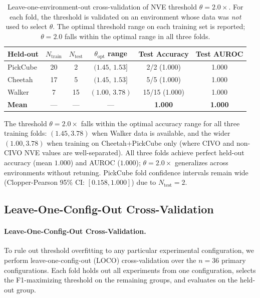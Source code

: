 \begin{table}[h]
\centering
\caption{Leave-one-environment-out cross-validation of NVE threshold $\theta=2.0\times$.
For each fold, the threshold is validated on an environment whose data was \emph{not} used
to select $\theta$. The optimal threshold range on each training set is reported;
$\theta=2.0$ falls within the optimal range in all three folds.}
\label{tab:nve_loeo}
\begin{tabular}{lccccc}
\toprule
Held-out & $N_{\text{train}}$ & $N_{\text{test}}$ & $\theta_{\text{opt}}$ range & Test Accuracy & Test AUROC \\
\midrule
PickCube & 20 & 2 & $(1.45,\, 1.53]$ & 2/2 (1.000) & 1.000 \\
Cheetah  & 17 & 5 & $(1.45,\, 1.53]$ & 5/5 (1.000) & 1.000 \\
Walker   &  7 & 15 & $(1.00,\, 3.78)$ & 15/15 (1.000) & 1.000 \\
\midrule
\textbf{Mean} & — & — & — & \textbf{1.000} & \textbf{1.000} \\
\bottomrule
\end{tabular}
\end{table}

The threshold $\theta{=}2.0\times$ falls within the optimal accuracy range for all three training folds: $(1.45, 3.78)$ when Walker data is available, and the wider $(1.00, 3.78)$ when training on Cheetah$+$PickCube only (where CIVO and non-CIVO NVE values are well-separated). All three folds achieve perfect held-out accuracy (mean $1.000$) and AUROC ($1.000$); $\theta{=}2.0\times$ generalizes across environments without retuning.
PickCube fold confidence intervals remain wide (Clopper-Pearson 95\% CI: $[0.158, 1.000]$) due to $N_{\text{test}}{=}2$.

\subsection{Leave-One-Config-Out Cross-Validation}
\label{sec:nve_loco}

\paragraph{Leave-One-Config-Out Cross-Validation.}
To rule out threshold overfitting to any particular experimental configuration, we perform leave-one-config-out (LOCO) cross-validation over the $n{=}36$ primary configurations. Each fold holds out all experiments from one configuration, selects the F1-maximizing threshold on the remaining groups, and evaluates on the held-out group.

